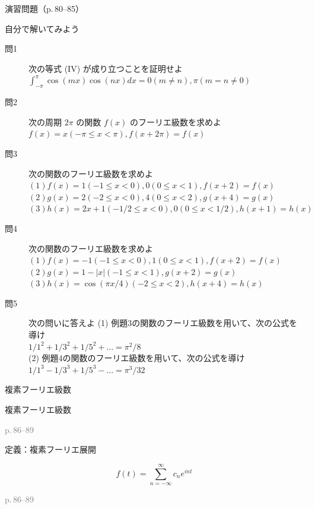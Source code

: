 \documentclass[aspectratio=43,professionalfonts,handout]{beamer}
\begin{document}
\begin{frame}{演習問題（p.\,80--85）}
  \begin{exampleblock}{自分で解いてみよう}
  \begin{description}
    \item[問1] 次の等式 (IV) が成り立つことを証明せよ
    $\int_{-\pi}^{\pi} \cos(mx) \cos(nx) dx = { 0  (m \neq n),  \pi  (m = n \neq 0) }$\\
    \item[問2] 次の周期 $2\pi$ の関数 $f(x)$ のフーリエ級数を求めよ
    $f(x) = x  (-\pi \leq x < \pi),  f(x+2\pi) = f(x)$\\
    \item[問3] 次の関数のフーリエ級数を求めよ
    $(1) f(x) = { 1  (-1 \leq x < 0),  0  (0 \leq x < 1) },  f(x+2) = f(x)$\\
    $(2) g(x) = { 2  (-2 \leq x < 0),  4  (0 \leq x < 2) },  g(x+4) = g(x)$\\
    $(3) h(x) = { 2x+1  (-1/2 \leq x < 0),  0  (0 \leq x < 1/2) },  h(x+1) = h(x)$\\
    \item[問4] 次の関数のフーリエ級数を求めよ
    $(1) f(x) = { -1  (-1 \leq x < 0),  1  (0 \leq x < 1) },  f(x+2) = f(x)$\\
    $(2) g(x) = 1 - |x|  (-1 \leq x < 1),  g(x+2) = g(x)$\\
    $(3) h(x) = \cos(\pi x/4)  (-2 \leq x < 2),  h(x+4) = h(x)$\\
    \item[問5] 次の問いに答えよ
    (1) 例題3の関数のフーリエ級数を用いて、次の公式を導け\\
    $1/1^{2} + 1/3^{2} + 1/5^{2} + \ldots = \pi^{2}/8$\\
    (2) 例題4の関数のフーリエ級数を用いて、次の公式を導け\\
    $1/1^{3} - 1/3^{3} + 1/5^{3} - \ldots = \pi^{3}/32$\\
  \end{description}
  \end{exampleblock}
\end{frame}

\begin{frame}{複素フーリエ級数}
  \begin{block}{}
  {\large 複素フーリエ級数}
  \end{block}
  \vfill\hfill{\scriptsize \textcolor{gray}{p.\,86--89}}
\end{frame}

\begin{frame}{定義：複素フーリエ展開}
  \begin{block}{}
  \[
    f(t) = \sum_{n=-\infty}^{\infty} c_{n} e^{int}
  \]
  \end{block}
  \vfill\hfill{\scriptsize \textcolor{gray}{p.\,86--89}}
\end{frame}
\end{document}
